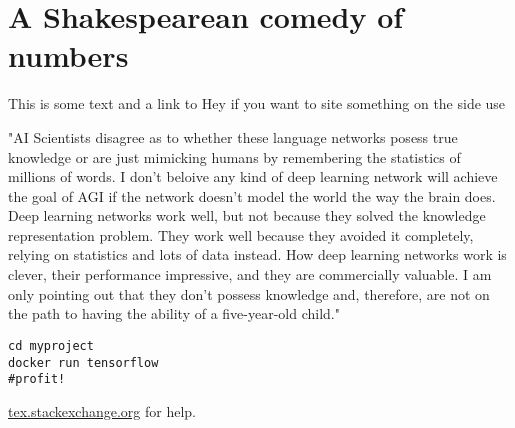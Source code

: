 \setchapterpreamble[u]{\margintoc}
\chapter{A Shakespearean comedy of numbers}


This is some text and a link to 
Hey if you want to site something on the side use

"AI Scientists disagree as to whether these language networks posess true knowledge or are just mimicking humans by remembering the statistics of millions of words. I don't beloive any kind of deep learning network will achieve the goal of AGI if the network doesn't model the world the way the brain does. Deep learning networks work well, but not because they solved the knowledge representation problem. They work well because they avoided it completely, relying on statistics and lots of data instead. How deep learning networks work is clever, their performance impressive, and they are commercially valuable. I am only pointing out that they don't possess knowledge and, therefore, are not on the path to having the ability of a five-year-old child." \cite{hawkins_2022}


\begin{lstlisting}[style=kaolstplain,linewidth=1.5\textwidth]
cd myproject
docker run tensorflow
#profit!
\end{lstlisting}

\url{tex.stackexchange.org} for help.
